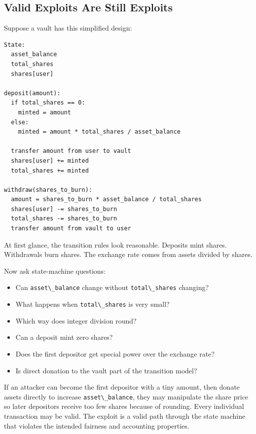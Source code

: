 \subsection{Valid Exploits Are Still Exploits}

Suppose a vault has this simplified design:

\begin{lstlisting}
State:
  asset_balance
  total_shares
  shares[user]

deposit(amount):
  if total_shares == 0:
    minted = amount
  else:
    minted = amount * total_shares / asset_balance

  transfer amount from user to vault
  shares[user] += minted
  total_shares += minted

withdraw(shares_to_burn):
  amount = shares_to_burn * asset_balance / total_shares
  shares[user] -= shares_to_burn
  total_shares -= shares_to_burn
  transfer amount from vault to user
\end{lstlisting}

At first glance, the transition rules look reasonable. Deposits mint
shares. Withdrawals burn shares. The exchange rate comes from assets
divided by shares.

Now ask state-machine questions:

\begin{itemize}
\tightlist
\item
  Can \passthrough{\lstinline!asset\_balance!} change without
  \passthrough{\lstinline!total\_shares!} changing?
\item
  What happens when \passthrough{\lstinline!total\_shares!} is very
  small?
\item
  Which way does integer division round?
\item
  Can a deposit mint zero shares?
\item
  Does the first depositor get special power over the exchange rate?
\item
  Is direct donation to the vault part of the transition model?
\end{itemize}

If an attacker can become the first depositor with a tiny amount, then
donate assets directly to increase
\passthrough{\lstinline!asset\_balance!}, they may manipulate the share
price so later depositors receive too few shares because of rounding.
Every individual transaction may be valid. The exploit is a valid path
through the state machine that violates the intended fairness and
accounting properties.

